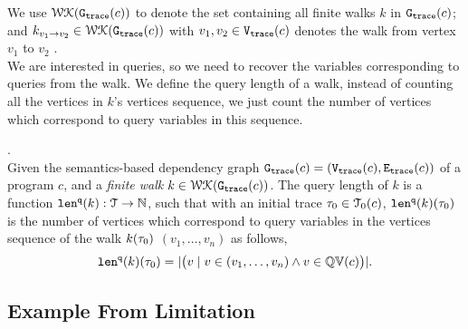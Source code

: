 We use $\mathcal{WK}(\mathtt{{G_{trace}}}(c))$ to denote 
the set containing all finite walks $k$ in $\mathtt{{G_{trace}}}(c)$;
and $k_{v_1 \to v_2} \in \mathcal{WK}(\mathtt{{G_{trace}}}(c))$ with $v_1, v_2 \in \mathtt{{V_{trace}}}(c)$ denotes the walk from vertex $v_1$ to $v_2$ . 
\\
We are interested in queries, so we need to recover the 
variables corresponding to queries from the walk. We define the query length of a walk, 
instead of counting all 
the vertices in $k$'s vertices sequence, we just count the number of vertices which correspond to query variables in this sequence.
%
\begin{defn}.
\label{def:qlen}
\\
Given 
the semantics-based dependency graph 
$\mathtt{{G_{trace}}}({c}) = (\mathtt{{V_{trace}}}({c}), \mathtt{{E_{trace}}}({c}))$ of a program $c$,
 and a \emph{finite walk} 
 $k \in \mathcal{WK}(\mathtt{{G_{trace}}}(c))$. 
The query length of $k$ is a function $\mathtt{len}^{\tt q}(k): \mathcal{T} \to \mathbb{N}$, such that with an initial trace  $\mathtt{\tau}_0 \in \mathcal{T}_0(c)$, $\mathtt{len}^{\tt q}(k)(\mathtt{\tau}_0)$ is
the number of vertices which correspond to query variables in the vertices sequence of the walk $k(\mathtt{\tau}_0)$
$(v_1, \ldots, v_{n})$ as follows, 
\[
  \mathtt{len}^{\tt q}(k)(\mathtt{\tau}_0) = |\big( v \mid v \in (v_1, \ldots, v_{n}) \land v \in \mathbb{QV}(c) \big)|.
\]
\end{defn}

\subsection{{Example From Limitation}}
